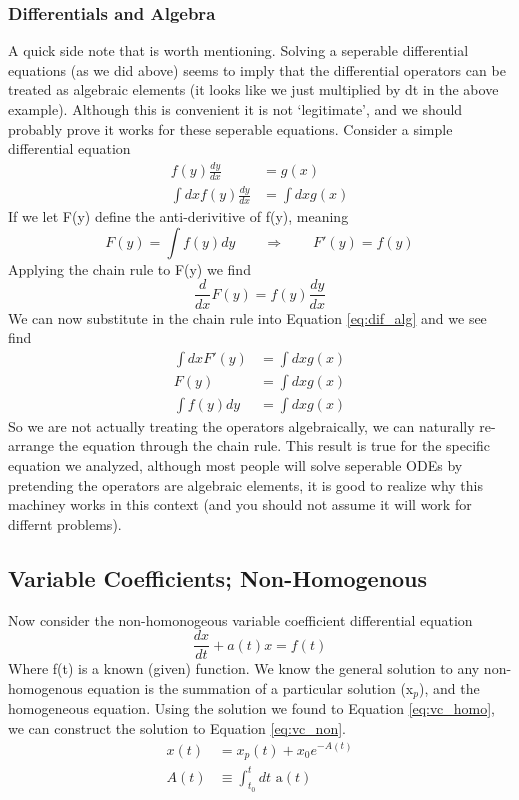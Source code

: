 \documentclass{article}
\newcommand{\be}{\begin{equation}}
\newcommand{\ee}{\end{equation}}
\begin{document}
\subsubsection*{Differentials and Algebra}
A quick side note that is worth mentioning.
Solving a seperable differential equations (as we did above) seems to imply that the differential operators can be treated as algebraic elements (it looks like we just multiplied by dt in the above example).
Although this is convenient it is not `legitimate', and we should probably prove it works for these seperable equations.
Consider a simple differential equation
\be \label{eq:dif_alg}
\begin{split}
    f(y) \frac{dy}{dx} &= g(x)\\
    \int dx f(y) \frac{dy}{dx} &= \int dx g(x)
\end{split}
\ee
If we let F(y) define the anti-derivitive of f(y), meaning
\be
F(y) = \int f(y) dy \qquad \Rightarrow \qquad F'(y) = f(y)
\ee
Applying the chain rule to F(y) we find
\be
\frac{d}{dx} F(y) = f(y) \frac{dy}{dx}
\ee
We can now substitute in the chain rule into Equation \ref{eq:dif_alg} and we see find
\be
\begin{split}
    \int dx F'(y) &= \int dx g(x)\\
    F(y) &= \int dx g(x) \\
    \int f(y) dy &= \int dx g(x)
\end{split}
\ee
So we are not actually treating the operators algebraically, we can naturally re-arrange the equation through the chain rule.
This result is true for the specific equation we analyzed, although most people will solve seperable ODEs by pretending the operators are algebraic elements, it is good to realize why this machiney works in this context (and you should not assume it will work for differnt problems). 

\subsection*{Variable Coefficients; Non-Homogenous}
Now consider the non-homonogeous variable coefficient differential equation
\be \label{eq:vc_non}
\frac{dx}{dt} + a(t) x = f(t)
\ee
Where f(t) is a known (given) function.
We know the general solution to any non-homogenous equation is the summation of a particular solution (x$_p$), and the homogeneous equation.
Using the solution we found to Equation \ref{eq:vc_homo}, we can construct the solution to Equation \ref{eq:vc_non}.
\be
\begin{split}
    x(t) &= x_p(t) + x_0 e^{-A(t)}\\
    A(t) & \equiv \int_{t_0}^t dt \text{ a}(t)
\end{split}
\ee
\end{document}
